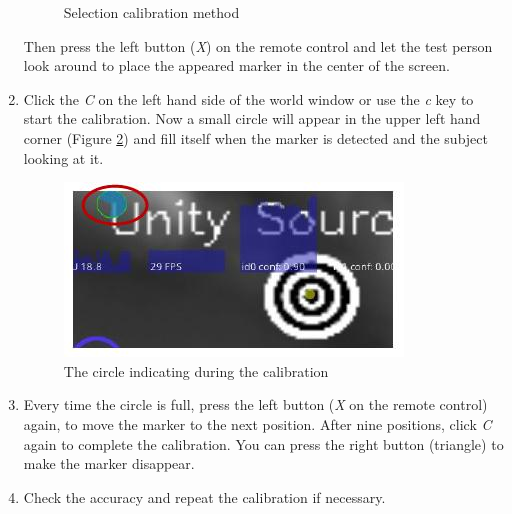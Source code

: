 \documentclass[../../Instruction_PupilCapture]{subfiles}
\begin{document}
\begin{enumerate}
\begin{figure}[h!]
		\caption{Selection calibration method}
		\label{fig:screenshot006}
	\end{figure}
	Then press the left button (\textit{X}) on the remote control and let the test person look around to place the appeared marker in the center of the screen.
	\item Click the \textit{C} on the left hand side of the world window or use the \textit{c} key to start the calibration. Now a small circle will appear in the upper left hand corner (Figure \ref{Calibration}) and fill itself when the marker is detected and the subject looking at it.
	\begin{figure}[h!]
		\centering
		\includegraphics[width=0.8\linewidth]{img/Calibration}
		\caption{The circle indicating during the calibration}
		\label{Calibration}
	\end{figure}
	\item Every time the circle is full, press the left button (\textit{X} on the remote control) again, to move the marker to the next position. After nine positions, click \textit{C} again to complete the calibration. You can press the right button (triangle) to make the marker disappear.
	\item Check the accuracy and repeat the calibration if necessary.
\end{enumerate}
\end{document}

